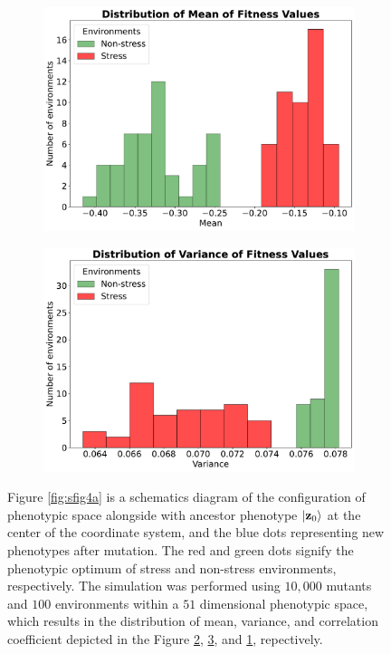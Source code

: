 \documentclass[11pt]{article}
\begin{document}
\begin{figure}
\begin{subfigure}{.5\textwidth}
  \caption{}
  \label{fig:sfig4b}
\end{subfigure} \\
\begin{subfigure}{.5\textwidth}
  \includegraphics[width=1\linewidth]{mean_simulation.pdf}
  \caption{}
  \label{fig:sfig4c}
\end{subfigure}%
\begin{subfigure}{.5\textwidth}
  \includegraphics[width=1\linewidth]{standard_deviation_simulation.pdf}
  \caption{}
  \label{fig:sfig4d}
\end{subfigure}
\caption{Figure \ref{fig:sfig4a} is a schematics diagram of the configuration of phenotypic space alongside with ancestor phenotype $\ket{\mathbf{z}_0}$ at the center of the coordinate system, and the blue dots representing  new phenotypes after mutation. The red and green dots signify the phenotypic optimum of stress and non-stress environments, respectively. The simulation was performed using $10,000$ mutants and $100$ environments within a $51$ dimensional phenotypic space, which results in the distribution of mean, variance, and correlation coefficient depicted in the Figure \ref{fig:sfig4c}, \ref{fig:sfig4d}, and \ref{fig:sfig4b}, repectively.}
\label{fig:fig4}
\end{figure}
\end{document}
